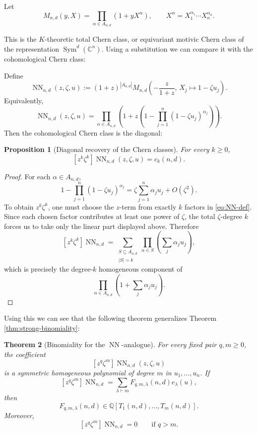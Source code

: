 \documentclass[11pt]{amsart}
\numberwithin{equation}{section}
\newtheorem{theorem}{Theorem}[section]
\newtheorem{proposition}[theorem]{Proposition}
\theoremstyle{remark}
\DeclareMathOperator{\Sym}{Sym}
\newcommand{\Q}{\mathbb Q}
\newcommand{\NN}{\operatorname{NN}}
\begin{document}
Let
\[
  M_{n,d}(y,X)=\prod_{\alpha\in A_{n,d}}(1+yX^\alpha),
  \qquad X^\alpha=X_1^{\alpha_1}\cdots X_n^{\alpha_n}.
\]

This is the $K$-theoretic total Chern class, or equivariant motivic Chern class of the representation $\Sym^d(\mathbb C^n)$. Using a substitution we can compare it with the cohomological Chern class:

Define
\[
  \NN_{n,d}(z,\zeta,u):=
  (1+z)^{|A_{n,d}|}
  M_{n,d}\left(-\frac{z}{1+z},\,X_j\mapsto 1-\zeta u_j\right).
\]
Equivalently,
\begin{equation}\label{eq:NN-def}
  \NN_{n,d}(z,\zeta,u)=
  \prod_{\alpha\in A_{n,d}}
  \left(1+z\left(1-\prod_{j=1}^n(1-\zeta u_j)^{\alpha_j}\right)\right).
\end{equation}
Then the cohomological Chern class is the diagonal:
\begin{proposition}[Diagonal recovery of the Chern classes]\label{prop:NN-diagonal}
For every $k\ge0$,
\[
  [z^k\zeta^k]\NN_{n,d}(z,\zeta,u)=c_k(n,d).
\]
\end{proposition}

\begin{proof}
For each $\alpha\in A_{n,d}$,
\[
  1-\prod_{j=1}^n(1-\zeta u_j)^{\alpha_j}
  =\zeta\sum_{j=1}^n\alpha_j u_j+O(\zeta^2).
\]
To obtain $z^k\zeta^k$, one must choose the $z$-term from exactly $k$ factors in \eqref{eq:NN-def}.  Since each chosen factor contributes at least one power of $\zeta$, the total $\zeta$-degree $k$ forces us to take only the linear part displayed above.  Therefore
\[
  [z^k\zeta^k]\NN_{n,d}
  =\sum_{\substack{S\subseteq A_{n,d}\\ |S|=k}}
  \prod_{\alpha\in S}\left(\sum_j\alpha_j u_j\right),
\]
which is precisely the degree-$k$ homogeneous component of
\[
  \prod_{\alpha\in A_{n,d}}
  \left(1+\sum_j\alpha_j u_j\right).
\]
\end{proof}
 Using this we can see that the following theorem generalizes Theorem \ref{thm:strong-binomiality}:
\begin{theorem}[Binomiality for the $\NN$-analogue]\label{thm:NN-binomiality}
For every fixed pair $q,m\ge0$, the coefficient
\[
  [z^q\zeta^m]\NN_{n,d}(z,\zeta,u)
\]
is a symmetric homogeneous polynomial of degree $m$ in $u_1,\ldots,u_n$.  If
\[
  [z^q\zeta^m]\NN_{n,d}
  =\sum_{\lambda\vdash m}F_{q,m,\lambda}(n,d)e_\lambda(u),
\]
then
\[
  F_{q,m,\lambda}(n,d)\in\Q[T_1(n,d),\ldots,T_m(n,d)].
\]
Moreover,
\[
  [z^q\zeta^m]\NN_{n,d}=0\qquad\text{if }q>m.
\]
\end{theorem}
\end{document}
